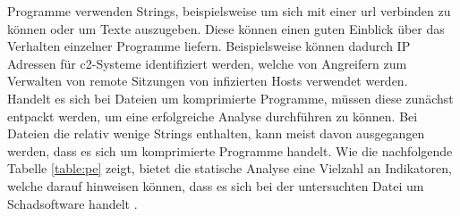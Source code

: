\documentclass[
    12pt, %
    DIV10,
    ngerman, %
    a4paper, %
    oneside, %
    titlepage, %
    parskip=half, %
    headings=normal, %
    listof=totoc, %
    bibliography=totoc, %
    index=totoc, %
    captions=tableheading, %
    final %
]{scrreprt}
\begin{document}
Programme verwenden Strings, beispielsweise um sich mit einer \ac{url} verbinden zu können oder um Texte auszugeben. Diese können einen guten Einblick über das Verhalten einzelner Programme liefern. Beispielsweise können dadurch IP Adressen für \ac{c2}-Systeme identifiziert werden, welche von Angreifern zum Verwalten von remote Sitzungen von infizierten Hosts verwendet werden.\\
Handelt es sich bei Dateien um komprimierte Programme, müssen diese zunächst entpackt werden, um eine erfolgreiche Analyse durchführen zu können. Bei Dateien die relativ wenige Strings enthalten, kann meist davon ausgegangen werden, dass es sich um komprimierte Programme handelt. Wie die nachfolgende Tabelle \ref{table:pe} zeigt, bietet die statische Analyse eine Vielzahl an Indikatoren, welche darauf hinweisen können, dass es sich bei der untersuchten Datei um Schadsoftware handelt \parencite{Sikorski2012}.
\end{document}
